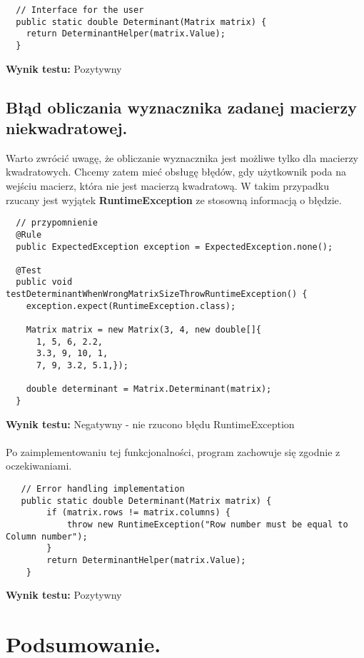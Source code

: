 \documentclass[a4paper,12pt,twoside]{article}
\begin{document}
\begin{lstlisting}
  // Interface for the user
  public static double Determinant(Matrix matrix) {
    return DeterminantHelper(matrix.Value);
  }
\end{lstlisting}
\medskip

\noindent
\textbf{Wynik testu: }{\color{green} Pozytywny}


\subsection{Błąd obliczania wyznacznika zadanej macierzy niekwadratowej.}
\bigskip

Warto zwrócić uwagę, że obliczanie wyznacznika jest możliwe tylko dla macierzy kwadratowych.
Chcemy zatem mieć obsługę błędów, gdy użytkownik poda na wejściu macierz, która nie
jest macierzą kwadratową. W takim przypadku rzucany jest wyjątek \textbf{RuntimeException}
ze stosowną informacją o błędzie.\\

\begin{lstlisting}
  // przypomnienie
  @Rule
  public ExpectedException exception = ExpectedException.none();

  @Test
  public void testDeterminantWhenWrongMatrixSizeThrowRuntimeException() {
    exception.expect(RuntimeException.class);

    Matrix matrix = new Matrix(3, 4, new double[]{
      1, 5, 6, 2.2,
      3.3, 9, 10, 1,
      7, 9, 3.2, 5.1,});

    double determinant = Matrix.Determinant(matrix);
  }
\end{lstlisting}
\medskip

\noindent
\textbf{Wynik testu: }{\color{red} Negatywny - nie rzucono błędu RuntimeException}\\\\
Po zaimplementowaniu tej funkcjonalności, program
zachowuje się zgodnie z oczekiwaniami.\\

\begin{lstlisting}
   // Error handling implementation
   public static double Determinant(Matrix matrix) {
        if (matrix.rows != matrix.columns) {
            throw new RuntimeException("Row number must be equal to Column number");
        }
        return DeterminantHelper(matrix.Value);
    }
\end{lstlisting}
\medskip

\noindent
\textbf{Wynik testu: }{\color{green} Pozytywny}


\section{Podsumowanie.}
\bigskip


\end{document}
